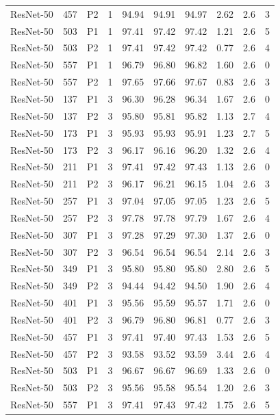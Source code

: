 {\begin{longtable}{lrllrrrrrr}
ResNet-50 & 457 & P2 & 1 & 94.94 & 94.91 & 94.97 & 2.62 & 2.6 & 3 \\
ResNet-50 & 503 & P1 & 1 & 97.41 & 97.42 & 97.42 & 1.21 & 2.6 & 5 \\
ResNet-50 & 503 & P2 & 1 & 97.41 & 97.42 & 97.42 & 0.77 & 2.6 & 4 \\
ResNet-50 & 557 & P1 & 1 & 96.79 & 96.80 & 96.82 & 1.60 & 2.6 & 0 \\
ResNet-50 & 557 & P2 & 1 & 97.65 & 97.66 & 97.67 & 0.83 & 2.6 & 3 \\
ResNet-50 & 137 & P1 & 3 & 96.30 & 96.28 & 96.34 & 1.67 & 2.6 & 0 \\
ResNet-50 & 137 & P2 & 3 & 95.80 & 95.81 & 95.82 & 1.13 & 2.7 & 4 \\
ResNet-50 & 173 & P1 & 3 & 95.93 & 95.93 & 95.91 & 1.23 & 2.7 & 5 \\
ResNet-50 & 173 & P2 & 3 & 96.17 & 96.16 & 96.20 & 1.32 & 2.6 & 4 \\
ResNet-50 & 211 & P1 & 3 & 97.41 & 97.42 & 97.43 & 1.13 & 2.6 & 0 \\
ResNet-50 & 211 & P2 & 3 & 96.17 & 96.21 & 96.15 & 1.04 & 2.6 & 3 \\
ResNet-50 & 257 & P1 & 3 & 97.04 & 97.05 & 97.05 & 1.23 & 2.6 & 5 \\
ResNet-50 & 257 & P2 & 3 & 97.78 & 97.78 & 97.79 & 1.67 & 2.6 & 4 \\
ResNet-50 & 307 & P1 & 3 & 97.28 & 97.29 & 97.30 & 1.37 & 2.6 & 0 \\
ResNet-50 & 307 & P2 & 3 & 96.54 & 96.54 & 96.54 & 2.14 & 2.6 & 3 \\
ResNet-50 & 349 & P1 & 3 & 95.80 & 95.80 & 95.80 & 2.80 & 2.6 & 5 \\
ResNet-50 & 349 & P2 & 3 & 94.44 & 94.42 & 94.50 & 1.90 & 2.6 & 4 \\
ResNet-50 & 401 & P1 & 3 & 95.56 & 95.59 & 95.57 & 1.71 & 2.6 & 0 \\
ResNet-50 & 401 & P2 & 3 & 96.79 & 96.80 & 96.81 & 0.77 & 2.6 & 3 \\
ResNet-50 & 457 & P1 & 3 & 97.41 & 97.40 & 97.43 & 1.53 & 2.6 & 5 \\
ResNet-50 & 457 & P2 & 3 & 93.58 & 93.52 & 93.59 & 3.44 & 2.6 & 4 \\
ResNet-50 & 503 & P1 & 3 & 96.67 & 96.67 & 96.69 & 1.33 & 2.6 & 0 \\
ResNet-50 & 503 & P2 & 3 & 95.56 & 95.58 & 95.54 & 1.20 & 2.6 & 3 \\
ResNet-50 & 557 & P1 & 3 & 97.41 & 97.43 & 97.42 & 1.75 & 2.6 & 5 \\

\end{longtable}}
